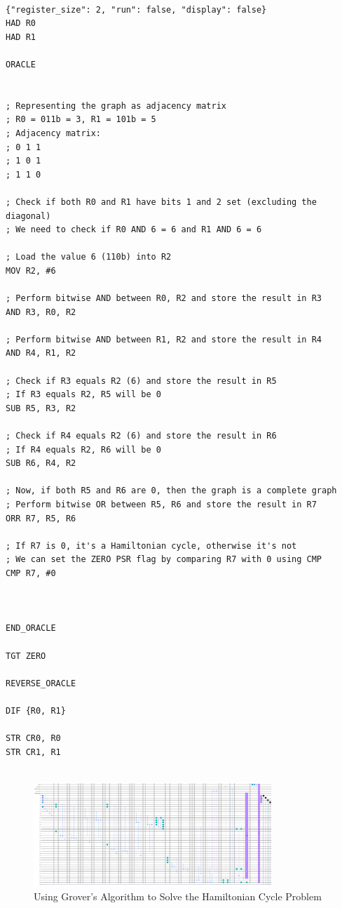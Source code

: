 \begin{lstlisting}

{"register_size": 2, "run": false, "display": false}
HAD R0
HAD R1

ORACLE


; Representing the graph as adjacency matrix
; R0 = 011b = 3, R1 = 101b = 5
; Adjacency matrix:
; 0 1 1
; 1 0 1
; 1 1 0

; Check if both R0 and R1 have bits 1 and 2 set (excluding the diagonal)
; We need to check if R0 AND 6 = 6 and R1 AND 6 = 6

; Load the value 6 (110b) into R2
MOV R2, #6

; Perform bitwise AND between R0, R2 and store the result in R3
AND R3, R0, R2

; Perform bitwise AND between R1, R2 and store the result in R4
AND R4, R1, R2

; Check if R3 equals R2 (6) and store the result in R5
; If R3 equals R2, R5 will be 0
SUB R5, R3, R2

; Check if R4 equals R2 (6) and store the result in R6
; If R4 equals R2, R6 will be 0
SUB R6, R4, R2

; Now, if both R5 and R6 are 0, then the graph is a complete graph
; Perform bitwise OR between R5, R6 and store the result in R7
ORR R7, R5, R6

; If R7 is 0, it's a Hamiltonian cycle, otherwise it's not
; We can set the ZERO PSR flag by comparing R7 with 0 using CMP
CMP R7, #0



END_ORACLE

TGT ZERO

REVERSE_ORACLE

DIF {R0, R1}

STR CR0, R0
STR CR1, R1


\end{lstlisting}

\begin{figure}[htp]
    \centering
    \includegraphics[width=9cm]{Figures/Hamiltonian_Cycle_circuit.png}
    \caption{Using Grover's Algorithm to Solve the Hamiltonian Cycle Problem}
    \label{fig:Hamiltonian_Cycle}
\end{figure}

